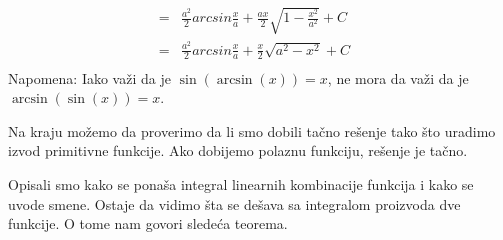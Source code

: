 \documentclass{article}
\begin{document}
\begin{primbox}
\begin{align*}
        = & \frac{a^2}{2}arcsin\frac{x}{a} + \frac{a x}{2}\sqrt{1-\frac{x^2}{a^2}} + C                       &                                                     \\
        = & \frac{a^2}{2}arcsin\frac{x}{a} + \frac{x}{2}\sqrt{a^2-x^2} + C                                   &                                                     \\
    \end{align*}
    \label{napomena_1_primer_1.9}Napomena: Iako važi da je $\sin(\arcsin(x))=x$, ne mora da važi da je $\arcsin(\sin(x))=x$.\par
    Na kraju možemo da proverimo da li smo dobili tačno rešenje tako što uradimo izvod primitivne funkcije.
    Ako dobijemo polaznu funkciju, rešenje je tačno.
\end{primbox}

Opisali smo kako se ponaša integral linearnih kombinacije funkcija i kako se uvode smene. Ostaje da vidimo
šta se dešava sa integralom proizvoda dve funkcije. O tome nam govori sledeća teorema.
\end{document}
